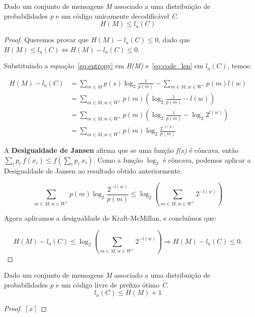 \begin{lemma} Dado um conjunto de mensagens \emph{M} associado a uma distribuição de probabilidades \emph{p} e um código unicamente decodificável \emph{C}.
\begin{equation*}
H(M) \leq l_a(C)
\end{equation*}

\begin{proof}
Queremos provar que $H(M) - l_a(C) \leq 0$, dado que  $H(M) \leq l_a(C) \Leftrightarrow H(M) - l_a(C) \leq 0$.

Substituindo a equação~\ref{eq:entropy} em \emph{H(M)} e~\ref{eq:code_len} em \emph{$l_a(C)$}, temos:

\begin{align*}
H(M) - l_a(C) &= \sum_{m \in M}^{}p(s) \log_2 \frac{1}{p(m)}  - \sum_{m \in M, w \in W^+}^{}p(m) l(w) \\
&= \sum_{m \in M, w \in W^+}^{}p(m) \left(  \log_2 \frac{1}{p(m)} - l(w) \right) \\
&= \sum_{m \in M, w \in W^+}^{}p(m) \left(  \log_2 \frac{1}{p(m)} - \log_2 2^{l(w)} \right) \\
&= \sum_{m \in M, w \in W^+}^{}p(m) \log_2 \frac{2^{-l(w)}}{p(m)}
\end{align*}

A \textbf{Desigualdade de Jansen} afirma que se uma função \emph{f(x)} é côncava, então $\sum_{i}{}p_i~f(x_i) \leq f(\sum_{i}{}p_i~x_i)$. Como a função $\log_2$ é côncava, podemos aplicar a Desigualdade de Jansen ao resultado obtido anteriormente.

\begin{equation*}
\sum_{m \in M, w \in W^+}^{}p(m) \log_2 \frac{2^{-l(w)}}{p(m)}  \leq \log_2(\sum_{m \in M, w \in W^+}{}2^{-l(w)})
\end{equation*}

Agora aplicamos a desigualdade de Kraft-McMillan, e concluímos que:

\begin{equation*}
H(M) - l_a(C) \leq \log_2(\sum_{m \in M, w \in W^+}{}2^{-l(w)}) \Rightarrow H(M) - l_a(C) \leq 0.
\end{equation*}


\end{proof}

\end{lemma}

\begin{lemma} Dado um conjunto de mensagens \emph{M} associado a uma distribuição de probabilidades \emph{p} e um código livre de prefixo ótimo \emph{C}.
\begin{equation*}
l_a(C) \leq H(M) + 1
\end{equation*}

\begin{proof}
$\left \lceil{x}\right \rceil $
\end{proof}
\end{lemma}

